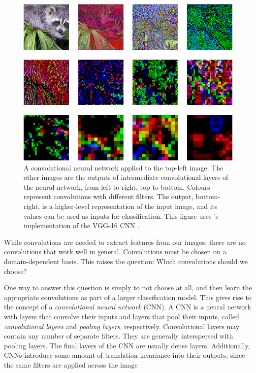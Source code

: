         \begin{figure}
            \centering
            \includegraphics[width=\textwidth]{images/face_cnn.png}
            \caption{A convolutional neural network applied to the top-left
                image. The other images are the outputs of intermediate
                convolutional layers of the neural network, from left to right,
                top to bottom. Colours represent convolutions with different
                filters. The output, bottom-right, is a higher-level
                representation of the input image, and its values can be used
                as inputs for classification. This figure uses
                \citeauthor{baraldi15}'s implementation of the VGG-16 CNN
                \citep{simoyan14}.}
            \label{fig:face-cnn}
        \end{figure}

        While convolutions are needed to extract features from our images, there
        are no convolutions that work well in general. Convolutions must be
        chosen on a domain-dependent basis. This raises the question: Which
        convolutions should we choose?

        One way to answer this question is simply to not choose at all, and
        then learn the appropriate convolutions as part of a larger
        classification model. This gives rise to the concept of a
        \emph{convolutional neural network} (CNN). A CNN is a neural network
        with layers that convolve their inputs and layers that pool their
        inputs, called \emph{convolutional layers} and \emph{pooling layers},
        respectively. Convolutional layers may contain any number of separate
        filters. They are generally interspersed with pooling layers. The final
        layers of the CNN are usually dense layers. Additionally, CNNs introduce
        some amount of translation invariance into their outputs, since the same
        filters are applied across the image \citep{lecun98}.


